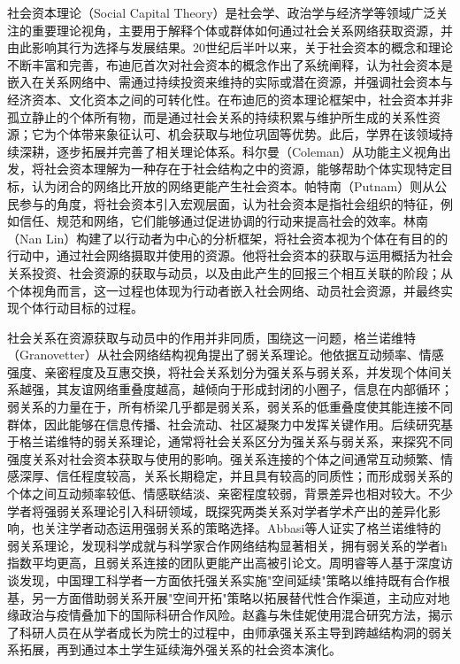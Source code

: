 社会资本理论（Social Capital Theory）是社会学、政治学与经济学等领域广泛关注的重要理论视角，主要用于解释个体或群体如何通过社会关系网络获取资源，并由此影响其行为选择与发展结果。20世纪后半叶以来，关于社会资本的概念和理论不断丰富和完善，布迪厄首次对社会资本的概念作出了系统阐释，认为社会资本是嵌入在关系网络中、需通过持续投资来维持的实际或潜在资源，并强调社会资本与经济资本、文化资本之间的可转化性。在布迪厄的资本理论框架中，社会资本并非孤立静止的个体所有物，而是通过社会关系的持续积累与维护所生成的关系性资源；它为个体带来象征认可、机会获取与地位巩固等优势。此后，学界在该领域持续深耕，逐步拓展并完善了相关理论体系。科尔曼（Coleman）从功能主义视角出发，将社会资本理解为一种存在于社会结构之中的资源，能够帮助个体实现特定目标，认为闭合的网络比开放的网络更能产生社会资本\cite{coleman1990}。帕特南（Putnam）则从公民参与的角度，将社会资本引入宏观层面，认为社会资本是指社会组织的特征，例如信任、规范和网络，它们能够通过促进协调的行动来提高社会的效率\cite{putnam2000}。林南（Nan Lin）构建了以行动者为中心的分析框架，将社会资本视为个体在有目的的行动中，通过社会网络摄取并使用的资源\cite{linnan2020}。他将社会资本的获取与运用概括为社会关系投资、社会资源的获取与动员，以及由此产生的回报三个相互关联的阶段；从个体视角而言，这一过程也体现为行动者嵌入社会网络、动员社会资源，并最终实现个体行动目标的过程。

社会关系在资源获取与动员中的作用并非同质，围绕这一问题，格兰诺维特（Granovetter）从社会网络结构视角提出了弱关系理论\cite{granovetter1973}。他依据互动频率、情感强度、亲密程度及互惠交换，将社会关系划分为强关系与弱关系，并发现个体间关系越强，其友谊网络重叠度越高，越倾向于形成封闭的小圈子，信息在内部循环；弱关系的力量在于，所有桥梁几乎都是弱关系，弱关系的低重叠度使其能连接不同群体，因此能够在信息传播、社会流动、社区凝聚力中发挥关键作用。后续研究基于格兰诺维特的弱关系理论，通常将社会关系区分为强关系与弱关系，来探究不同强度关系对社会资本获取与使用的影响。强关系连接的个体之间通常互动频繁、情感深厚、信任程度较高，关系长期稳定，并且具有较高的同质性；而形成弱关系的个体之间互动频率较低、情感联结淡、亲密程度较弱，背景差异也相对较大。不少学者将强弱关系理论引入科研领域，既探究两类关系对学者学术产出的差异化影响，也关注学者动态运用强弱关系的策略选择。Abbasi等人证实了格兰诺维特的弱关系理论，发现科学成就与科学家合作网络结构显著相关，拥有弱关系的学者h指数平均更高，且弱关系连接的团队更能产出高被引论文\cite{fronczak2022}。周明睿等人基于深度访谈发现，中国理工科学者一方面依托强关系实施"空间延续"策略以维持既有合作根基，另一方面借助弱关系开展"空间开拓"策略以拓展替代性合作渠道，主动应对地缘政治与疫情叠加下的国际科研合作风险\cite{zhoumingrui2024}。赵鑫与朱佳妮使用混合研究方法，揭示了科研人员在从学者成长为院士的过程中，由师承强关系主导到跨越结构洞的弱关系拓展，再到通过本土学生延续海外强关系的社会资本演化\cite{zhaoxin2025}。

